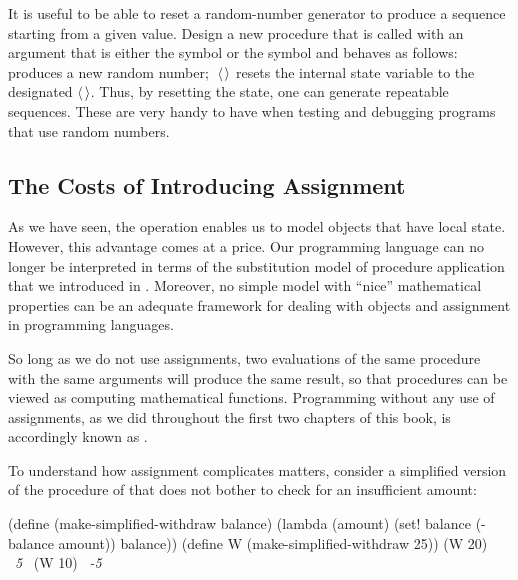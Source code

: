 \begin{exerciseGroup}
\label{Exercise 3.6}
 It is useful to be able to reset a
random-number generator to produce a sequence starting from a given value.
Design a new  procedure that is called with an argument that is
either the symbol  or the symbol  and behaves as
follows:  produces a new random number; \( \;\langle \)\( \kern0.11em\rangle \)\code{)} resets the internal state variable to the
designated \( \langle \)\( \kern0.08em\rangle \).  Thus, by resetting the state, one can generate
repeatable sequences.  These are very handy to have when testing and debugging
programs that use random numbers.
\end{exerciseGroup}

\subsection{The Costs of Introducing Assignment}
\label{Section 3.1.3}

As we have seen, the  operation enables us to model objects that
have local state.  However, this advantage comes at a price.  Our programming
language can no longer be interpreted in terms of the substitution model of
procedure application that we introduced in .  Moreover, no
simple model with ``nice'' mathematical properties can be an adequate framework
for dealing with objects and assignment in programming languages.

So long as we do not use assignments, two evaluations of the same procedure
with the same arguments will produce the same result, so that procedures can be
viewed as computing mathematical functions.  Programming without any use of
assignments, as we did throughout the first two chapters of this book, is
accordingly known as .

To understand how assignment complicates matters, consider a simplified version
of the  procedure of  that does not
bother to check for an insufficient amount:

\begin{codeBlock}
(define (make-simplified-withdraw balance)
  (lambda (amount)
    (set! balance (- balance amount))
    balance))
(define W (make-simplified-withdraw 25))
(W 20)
~\textit{5}~
(W 10)
~\textit{-5}~
\end{codeBlock}

